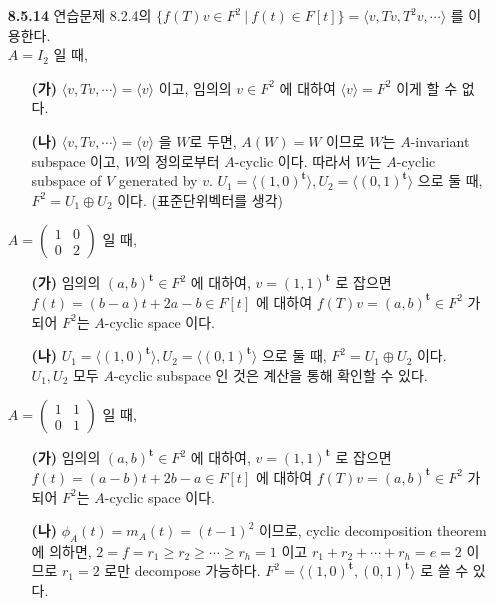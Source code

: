 \documentclass[12pt]{report}
\newcommand*{\trans}{^{\mathrm{\mathbf{t}}}}%
\begin{document}
\begin{itemize}
\item[\textbf{8.5.14}] 연습문제 8.2.4의 $\{f(T)v\in F^2\: |\: f(t)\in F[t]\} = \langle v, Tv, T^2v, \cdots\rangle$ 를 이용한다. \\$A = I_2$ 일 때,
	\begin{itemize}
		\item[\textbf{(가)}] $\langle v, Tv, \cdots \rangle = \langle v\rangle$ 이고, 임의의 $v\in F^2$ 에 대하여 $\langle v\rangle = F^2$ 이게 할 수 없다.
		\item[\textbf{(나)}] $\langle v, Tv, \cdots \rangle = \langle v\rangle$ 을 $W$로 두면, $A(W) = W$ 이므로 $W$는 $A$-invariant subspace 이고, $W$의 정의로부터 $A$-cyclic 이다. 따라서 $W$는 $A$-cyclic subspace of $V$ generated by $v$. $U_1 = \langle (1, 0)\trans \rangle, U_2 = \langle (0, 1)\trans \rangle$ 으로 둘 때, $F^2=U_1 \oplus U_2$ 이다. (표준단위벡터를 생각)
	\end{itemize} 
	$A = \begin{pmatrix}1&0\\0&2\end{pmatrix}$ 일 때,
	\begin{itemize}
		\item[\textbf{(가)}] 임의의 $(a, b)\trans\in F^2$ 에 대하여, $v=(1, 1)\trans$ 로 잡으면 $f(t) = (b-a)t+2a-b \in F[t]$ 에 대하여 $f(T)v = (a, b)\trans \in F^2$ 가 되어 $F^2$는 $A$-cyclic space 이다.
		\item[\textbf{(나)}] $U_1 = \langle (1, 0)\trans \rangle, U_2 = \langle (0, 1)\trans \rangle$ 으로 둘 때, $F^2=U_1 \oplus U_2$ 이다. $U_1, U_2$ 모두 $A$-cyclic subspace 인 것은 계산을 통해 확인할 수 있다.
	\end{itemize}
	$A = \begin{pmatrix}1&1\\0&1\end{pmatrix}$ 일 때,
	\begin{itemize}
		\item[\textbf{(가)}] 임의의 $(a, b)\trans\in F^2$ 에 대하여, $v=(1, 1)\trans$ 로 잡으면 $f(t) = (a-b)t+2b-a \in F[t]$ 에 대하여 $f(T)v = (a, b)\trans \in F^2$ 가 되어 $F^2$는 $A$-cyclic space 이다.
		\item[\textbf{(나)}] $\phi_A(t) = m_A(t) = (t-1)^2$ 이므로, cyclic decomposition theorem 에 의하면, $2 = f=r_1\geq r_2\geq \cdots \geq r_h = 1$ 이고 $r_1+r_2+\cdots+r_h=e=2$ 이므로 $r_1=2$ 로만 decompose 가능하다. $F^2 = \langle(1, 0)\trans, (0, 1)\trans\rangle$ 로 쓸 수 있다.
	\end{itemize}


\end{itemize}
\end{document}
